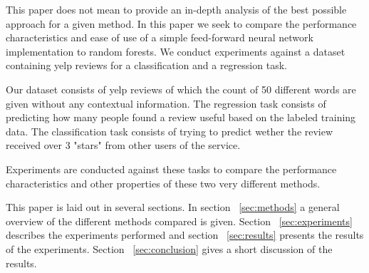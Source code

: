 
This paper does not mean to provide an in-depth analysis of the best possible approach for a given method. In this paper we seek to compare the performance characteristics and ease of use of a simple feed-forward neural network implementation to random forests. We conduct experiments against a dataset containing yelp reviews for a classification and a regression task.

Our dataset consists of yelp reviews of which the count of 50 different words are given without any contextual information. The regression task consists of predicting how many people found a review useful based on the labeled training data. The classification task consists of trying to predict wether the review received over 3 "stars" from other users of the service.

Experiments are conducted against these tasks to compare the performance characteristics and other properties of these two very different methods.

This paper is laid out in several sections. In section ~\ref{sec:methods} a general overview of the different methods compared is given. Section ~\ref{sec:experiments} describes the experiments performed and section ~\ref{sec:results} presents the results of the experiments. Section ~\ref{sec:conclusion} gives a short discussion of the results.


